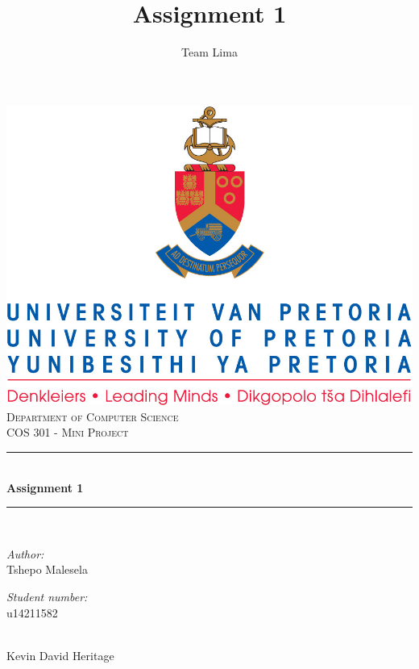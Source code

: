 \documentclass[a4paper,12pt]{report}
\author{Team Lima}
\title{ Assignment 1}
\newcommand{\HRule}{\rule{\linewidth}{0.5mm}}
\begin{document}
\setlength{\parskip}{6pt}

\begin{titlepage}

\begin{center}
\includegraphics[width=1\textwidth]{./images/up-logo.jpg}\\[0.4cm]    
\textsc{\LARGE Department of Computer Science}\\[1.5cm]
\textsc{\Large COS 301 - Mini Project}\\[0.5cm]
\HRule \\[0.4cm]
{ \huge \bfseries Assignment 1}\\[0.4cm]
\HRule \\[0.4cm]
\begin{minipage}{0.4\textwidth}
\begin{flushleft} \large
\emph{Author:}\\
Tshepo {Malesela}
\end{flushleft}
\end{minipage}
\begin{minipage}{0.4\textwidth}
\begin{flushright} \large
\emph{Student number:} \\
u14211582
\end{flushright}
\end{minipage}
\begin{minipage}{0.4\textwidth}
\begin{flushleft} \large
\emph{} \\
Kevin David {Heritage}
\end{flushleft}

\end{minipage}
\end{center}
\end{titlepage}
\end{document}
